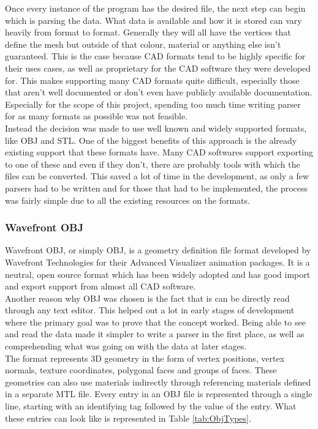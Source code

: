 Once every instance of the program has the desired file, the next step can begin which is parsing the data. What data is available and how it is stored can vary heavily from format to format. Generally they will all have the vertices that define the mesh but outside of that colour, material or anything else isn't guaranteed. This is the case because CAD formats tend to be highly specific for their uses cases, as well as proprietary for the CAD software they were developed for. This makes supporting many CAD formats quite difficult, especially those that aren't well documented or don't even have publicly available documentation. Especially for the scope of this project, spending too much time writing parser for as many formats as possible was not feasible.\\
Instead the decision was made to use well known and widely supported formats, like OBJ and STL. One of the biggest benefits of this approach is the already existing support that these formats have. Many CAD softwares support exporting to one of these and even if they don't, there are probably tools with which the files can be converted. This saved a lot of time in the development, as only a few parsers had to be written and for those that had to be implemented, the process was fairly simple due to all the existing resources on the formats.

\subsubsection{Wavefront OBJ}

Wavefront OBJ, or simply OBJ, is a geometry definition file format developed by Wavefront Technologies for their Advanced Visualizer animation packages. It is a neutral, open source format which has been widely adopted and has good import and export support from almost all CAD software.\\
Another reason why OBJ was chosen is the fact that is can be directly read through any text editor. This helped out a lot in early stages of development where the primary goal was to prove that the concept worked. Being able to see and read the data made it simpler to write a parser in the first place, as well as comprehending what was going on with the data at later stages.\\ 
The format represents 3D geometry in the form of vertex positions, vertex normals, texture coordinates, polygonal faces and groups of faces. These geometries can also use materials indirectly through referencing materials defined in a separate MTL file. Every entry in an OBJ file is represented through a single line, starting with an identifying tag followed by the value of the entry. What these entries can look like is represented in Table \ref{tab:ObjTypes}.

